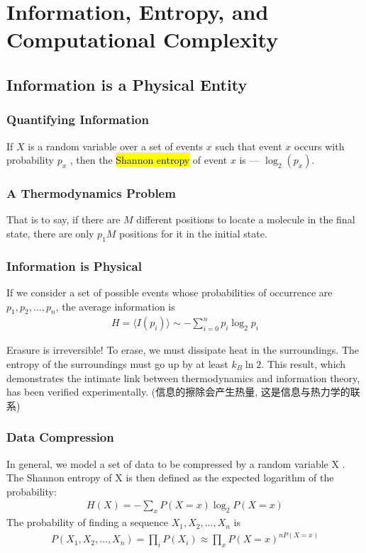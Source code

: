 \newpage
\section{Information, Entropy, and Computational Complexity}

\subsection{Information is a Physical Entity}

\subsubsection{Quantifying Information}
If $X$ is a random variable over a set of events $x$ such that event $x$ occurs with probability $p_x$ , then the \hl{Shannon entropy} of event $x$ is --- $\log_2(p_x )$.


\subsubsection{A Thermodynamics Problem}
That is to say, if there are $M$ different positions to locate a molecule in the final state, there are only $p_1 M$ positions for it in the initial state.

\subsubsection{Information is Physical}
If we consider a set of possible events whose probabilities of occurrence are $p_1, p_2, \dots , p_n$, the average information is
\begin{align*}
    H=\langle I(p_i) \rangle \sim -\sum_{i=0}^n p_i\log_2 p_i
\end{align*}


Erasure is irreversible! To erase, we must dissipate heat in
the surroundings. The entropy of the surroundings must go
up by at least $k_B \ln 2$. This result, which demonstrates the intimate link between thermodynamics and information
theory, has been verified experimentally. (信息的擦除会产生热量, 这是信息与热力学的联系)

\subsubsection{Data Compression}
In general, we model a set of data to be compressed by a
random variable X . The Shannon entropy of X is then
defined as the expected logarithm of the probability:
\begin{align*}
    H(X)=-\sum_x P(X=x)\log_2 P(X=x)
\end{align*}
The probability of finding a sequence $X_1, X_2, \dots , X_n$ is
\begin{align*}
    P(X_1, X_2, \dots , X_n)=\prod_i P(X_i) \approx \prod_x P(X=x)^{nP(X=x)}
\end{align*}

